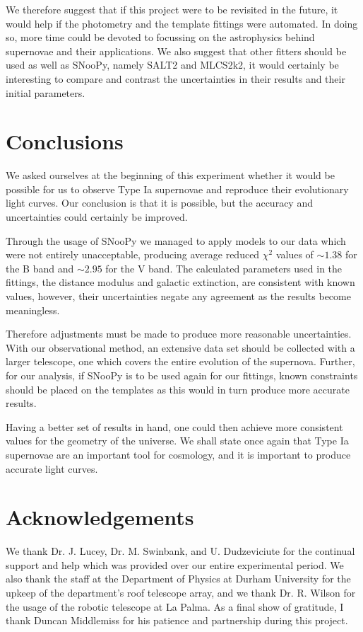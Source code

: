 \documentclass[twocolumn]{revtex4}
\begin{document}
We therefore suggest that if this project were to be revisited in the future, it would help if the photometry and the template fittings were automated. In doing so, more time could be devoted to focussing on the astrophysics behind supernovae and their applications. We also suggest that other fitters should be used as well as SNooPy, namely SALT2 and MLCS2k2, it would certainly be interesting to compare and contrast the uncertainties in their results and their initial parameters.

\vspace{-4ex}
\section{Conclusions}
\label{conclusions}
\vspace{-2ex}

We asked ourselves at the beginning of this experiment whether it would be possible for us to observe Type Ia supernovae and reproduce their evolutionary light curves. Our conclusion is that it is possible, but the accuracy and uncertainties could certainly be improved. 

Through the usage of SNooPy we managed to apply models to our data which were not entirely unacceptable, producing average reduced $\chi^2$ values of $\sim 1.38$ for the B band and $\sim 2.95$ for the V band. The calculated parameters used in the fittings, the distance modulus and galactic extinction, are consistent with known values, however, their uncertainties negate any agreement as the results become meaningless. 

Therefore adjustments must be made to produce more reasonable uncertainties. With our observational method, an extensive data set should be collected with a larger telescope, one which covers the entire evolution of the supernova. Further, for our analysis, if SNooPy is to be used again for our fittings, known constraints should be placed on the templates as this would in turn produce more accurate results.

Having a better set of results in hand, one could then achieve more consistent values for the geometry of the universe. We shall state once again that Type Ia supernovae are an important tool for cosmology, and it is important to produce accurate light curves.

\vspace{-4ex}
\section*{Acknowledgements}
\vspace{-2ex}
We thank Dr. J. Lucey, Dr. M. Swinbank, and U. Dudzeviciute for the continual support and help which was provided over our entire experimental period. We also thank the staff at the Department of Physics at Durham University for the upkeep of the department's roof telescope array, and we thank Dr. R. Wilson for the usage of the robotic telescope at La Palma. As a final show of gratitude, I thank Duncan Middlemiss for his patience and partnership during this project.
\end{document}
